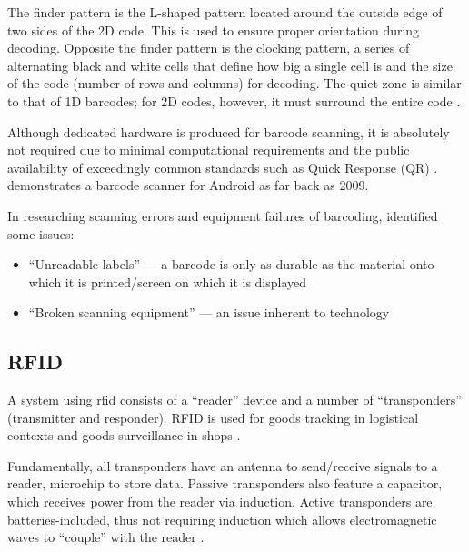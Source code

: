 \begin{displayquote}
  The finder pattern is the L-shaped
  pattern located around the outside edge of two sides of the
  2D code.
  This is used to ensure proper orientation during decoding.
  Opposite the finder pattern is the clocking pattern, a
  series of alternating black and white cells that define how
  big a single cell is and the size of the code (number of
  rows and columns) for decoding.
  The quiet zone is similar to that of 1D barcodes; for 2D
  codes, however, it must surround the entire code
  \parencite{whatIsABarcode}.
\end{displayquote}

Although dedicated hardware is produced for barcode
scanning, it is absolutely not required due to minimal
computational requirements and the public availability of
exceedingly common standards such as Quick Response (QR)
\parencite{qrCodeStandard}.
\cite{androidBarcodeScanner} demonstrates a barcode scanner
for Android as far back as 2009.

In researching scanning errors and equipment failures of
barcoding, \cite{barcodeRfidComparison} identified some
issues: 

\begin{itemize} 

  \item \enquote{Unreadable labels} --- a barcode is only as
        durable as the material onto which it is printed/screen on
        which it is displayed 

  \item \enquote{Broken scanning equipment} --- an issue
        inherent to technology 

\end{itemize} 

\subsection{RFID} \label{ss:rfid} 

A system using \gls{rfid} consists of a \enquote{reader}
device and a number of \enquote{transponders} (transmitter
and responder).
RFID is used for goods tracking in logistical contexts and
goods surveillance in shops \parencite{whatIsRfid}.

Fundamentally, all transponders have an antenna to
send/receive signals to a reader, microchip to store data.
Passive transponders also feature a capacitor, which
receives power from the reader via induction.
Active transponders are batteries-included, thus not
requiring induction which allows electromagnetic waves to
\enquote{couple} with the reader \parencite{whatIsRfid}.

